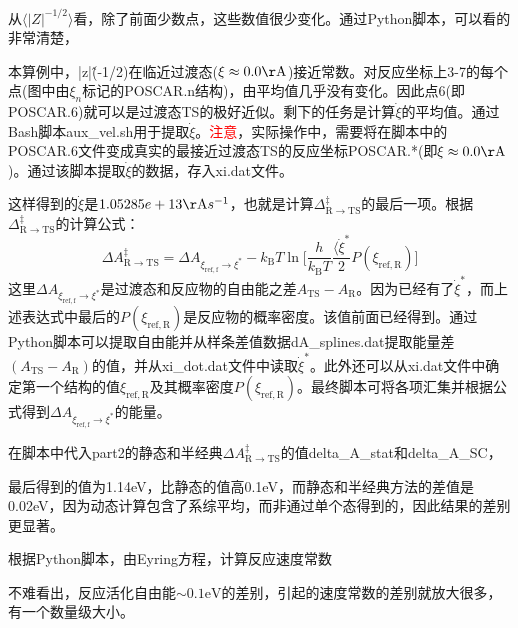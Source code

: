 从$\langle|Z|^{-1/2}\rangle$看，除了前面少数点，这些数值很少变化。通过\textrm{Python}脚本，可以看的非常清楚，

本算例中，\textrm{|z|\^(-1/2)}在临近过渡态($\xi\approx0.0\mathrm{\AA}$)接近常数。对反应坐标上3-7的每个点(图中由$\xi_n$标记的\textrm{POSCAR.n}结构)，由平均值几乎没有变化。因此点6(即\textrm{POSCAR.6})就可以是过渡态\textrm{TS}的极好近似。剩下的任务是计算$\dot{\xi}$的平均值。通过\textrm{Bash}脚本\textrm{aux\_vel.sh}用于提取$\dot{\xi}$。\textcolor{red}{注意}，实际操作中，需要将在脚本中的\textrm{POSCAR.6}文件变成真实的最接近过渡态\textrm{TS}的反应坐标\textrm{POSCAR.*}(即$\xi\approx0.0\mathrm{\AA}$)。通过该脚本提取$\dot{\xi}$的数据，存入\textrm{xi.dat}文件。

这样得到的$\dot{\xi}$是$1.05285e+13\mathrm{\AA}s^{-1}$，也就是计算$\Delta_{\mathrm{R}\rightarrow\mathrm{TS}}^{\ddagger}$的最后一项。根据$\Delta_{\mathrm{R}\rightarrow\mathrm{TS}}^{\ddagger}$的计算公式：
\begin{displaymath}
	\Delta A_{\mathrm{R}\rightarrow\mathrm{TS}}^{\ddagger}=\Delta A_{\xi_{\mathrm{ref},\mathrm{f}}\rightarrow{\xi}^{\ast}}-k_{\mathrm{B}}T\ln\bigg[\dfrac{h}{k_{\mathrm{B}}T}\dfrac{\langle\dot{\xi}^{\ast}}2P(\xi_{\mathrm{ref},\mathrm{R}})\bigg]
\end{displaymath}
这里$\Delta A_{\xi_{\mathrm{ref},\mathrm{f}}\rightarrow{\xi}^{\ast}}$是过渡态和反应物的自由能之差$A_{\mathrm{TS}}-A_{\mathrm{R}}$。因为已经有了$\dot{\xi}^{\ast}$，而上述表达式中最后的$P(\xi_{\mathrm{ref},\mathrm{R}})$是反应物的概率密度。该值前面已经得到。通过\textrm{Python}脚本可以提取自由能并从样条差值数据\textrm{dA\_splines.dat}提取能量差$(A_{\mathrm{TS}}-A_{\mathrm{R}})$的值，并从\textrm{xi\_dot.dat}文件中读取$\dot{\xi}^{\ast}$。此外还可以从\textrm{xi.dat}文件中确定第一个结构的值$\xi_{\mathrm{ref},\mathrm{R}}$及其概率密度$P(\xi_{\mathrm{ref},\mathrm{R}})$。最终脚本可将各项汇集并根据公式得到$\Delta A_{\xi_{\mathrm{ref},\mathrm{f}}\rightarrow{\xi}^{\ast}}$的能量。

在脚本中代入\textrm{part2}的静态和半经典$\Delta A_{\mathrm{R}\rightarrow\mathrm{TS}}^{\ddagger}$的值\textrm{delta\_A\_stat}和\textrm{delta\_A\_SC}，

最后得到的值为\textrm{1.14eV}，比静态的值高\textrm{0.1eV}，而静态和半经典方法的差值是\textrm{0.02eV}，因为动态计算包含了系综平均，而非通过单个态得到的，因此结果的差别更显著。

根据\textrm{Python}脚本，由\textrm{Eyring}方程，计算反应速度常数

不难看出，反应活化自由能$\sim0.1\mathrm{eV}$的差别，引起的速度常数的差别就放大很多，有一个数量级大小。
